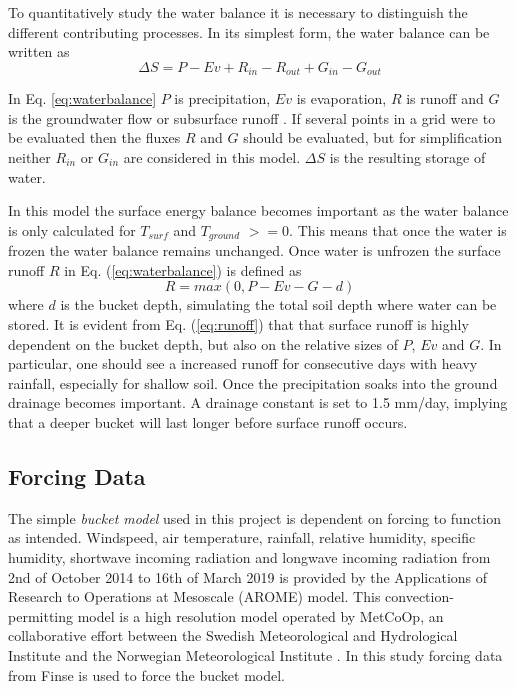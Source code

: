 \documentclass[a4paper,11pt,twocolumn]{article}
\begin{document}
To quantitatively study the water balance it is necessary to distinguish the different contributing processes. In its simplest form, the water balance can be written as \cite{dingman} 
\begin{equation}
	\Delta S = P - Ev + R_{in} - R_{out} + G_{in} - G_{out} 
	\label{eq:waterbalance}
\end{equation}

In Eq. \ref{eq:waterbalance} $P$ is precipitation, $Ev$ is evaporation, $R$ is runoff and $G$ is the groundwater flow or subsurface runoff \cite{dingman}. If several points in a grid were to be evaluated then the fluxes $R$ and $G$ should be evaluated, but for simplification neither $R_{in}$ or $G_{in}$ are considered in this model. $\Delta S$ is the resulting storage of water.    

In this model the surface energy balance becomes important as the water balance is only calculated for $T_{surf}$ and $T_{ground}$ $>=0$. This means that once the water is frozen the water balance remains unchanged. Once water is unfrozen the surface runoff $R$ in Eq. (\ref{eq:waterbalance}) is defined as
\begin{equation}
	R = max(0, P-Ev-G-d)
	\label{eq:runoff}
\end{equation}  
where $d$ is the bucket depth, simulating the total soil depth where water can be stored. It is evident from Eq. (\ref{eq:runoff}) that that surface runoff is highly dependent on the bucket depth, but also on the relative sizes of $P$, $Ev$ and $G$. In particular, one should see a increased runoff for consecutive days with heavy rainfall, especially for shallow soil.  
Once the precipitation soaks into the ground drainage becomes important. A drainage constant is set to 1.5 mm/day, implying that a deeper bucket will last longer before surface runoff occurs. 

\subsection{Forcing Data}

The simple \textit{bucket model} used in this project is dependent on forcing to function as intended. Windspeed, air temperature, rainfall, relative humidity, specific humidity, shortwave incoming radiation and longwave incoming radiation from 2nd of October 2014 to 16th of March 2019 is provided by the Applications of Research to Operations at Mesoscale (AROME) model. This convection-permitting model is a high resolution model operated by MetCoOp, an collaborative effort between the Swedish Meteorological and Hydrological Institute and the Norwegian Meteorological Institute \cite{muller}. In this study forcing data from Finse is used to force the bucket model. 
\end{document}
